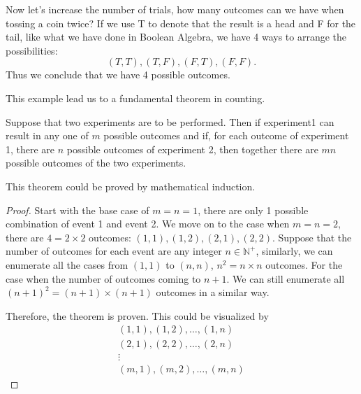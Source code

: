     Now let's increase the number of trials, how many outcomes can we have when tossing a coin twice? If we use T to denote that the result is a head and F for the tail, like what we have
    done in Boolean Algebra, we have 4 ways to arrange the possibilities:
    $$(T,T), (T,F), (F,T),(F,F).$$
    Thus we conclude that we have 4 possible outcomes. 

    This example lead us to a fundamental theorem in counting.
    \begin{theorem}\label{Principal of Counting}
        Suppose that two experiments are to be performed. Then if experiment1 can
        result in any one of $m$ possible outcomes and if, for each outcome of experiment 1, there are $n$ possible outcomes of experiment 2, then together there are $mn$
        possible outcomes of the two experiments.
    \end{theorem}

    This theorem could be proved by mathematical induction.
    \begin{proof}
        Start with the base case of $m = n = 1$, there are only 1 possible combination of event 1 and event 2.
        We move on to the case when $m = n = 2$, there are $4 = 2\times 2$ outcomes: $(1, 1), (1, 2), (2, 1), (2, 2)$.
        Suppose that the number of outcomes for each event are any integer $n \in \mathbb{N}^+$, similarly, we can enumerate all the cases from $(1, 1)$ to $(n, n)$,  $n^2 = n\times n$ outcomes.
        For the case when the number of outcomes coming to $n+1$. We can still enumerate all $(n+1)^2 = (n+1)\times(n+1)$ outcomes in a similar way.
        \par Therefore, the theorem is proven. This could be visualized by $$\begin{array}{l}(1,1),(1,2), \ldots,(1, n) \\(2,1),(2,2), \ldots,(2, n) \\\vdots \\(m, 1),(m, 2), \ldots,(m, n)\end{array}$$
    \end{proof}

